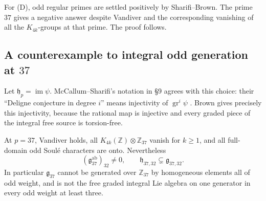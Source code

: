 For (D), odd regular primes are settled positively by Sharifi--Brown. The prime $37$ gives a negative answer despite Vandiver and the corresponding vanishing of all the $K_{4k}$-groups at that prime. The proof follows.

\subsection{A counterexample to integral odd generation at \texorpdfstring{$37$}{37}}
\label{sec:integral37}

Let $\mathfrak h_p=\operatorname{im}\psi$. McCallum--Sharifi's notation in \S9 agrees with this choice: their ``Deligne conjecture in degree $i$'' means injectivity of $\operatorname{gr}^i\psi$ \cite[p.~24]{McCallumSharifi2003}. Brown gives precisely this injectivity, because the rational map is injective and every graded piece of the integral free source is torsion-free.

\begin{proposition}[T-INTEGRAL37]\label{prop:37-counterexample}
At $p=37$, Vandiver holds, all $K_{4k}(\mathbb Z)\otimes\mathbb Z_{37}$ vanish for $k\geq1$, and all full-domain odd Soul\'e characters are onto. Nevertheless
\[
 (\mathfrak g_{37}^{\mathrm{ab}})_{32}\neq0,
 \qquad
 \mathfrak h_{37,32}\subsetneq\mathfrak g_{37,32}.
\]
In particular $\mathfrak g_{37}$ cannot be generated over $\mathbb Z_{37}$ by homogeneous elements all of odd weight, and is not the free graded integral Lie algebra on one generator in every odd weight at least three.
\end{proposition}

